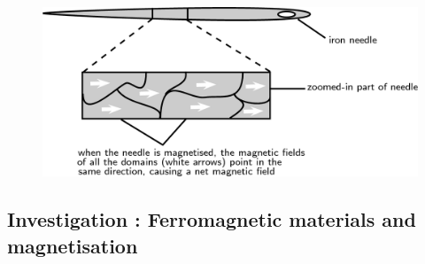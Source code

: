 	\begin{figure}[H] %
    \begin{center}
    \label{m37830*id128403!!!underscore!!!media}\label{m37830*id128403!!!underscore!!!printimage}\includegraphics[width=0.8\columnwidth]{col11305.imgs/m37830_PG10C7_003.png} %
        
      \vspace{2pt}
    \vspace{.1in}
    
    \end{center}

 \end{figure}   

    \addtocounter{footnote}{-0}
    
      \par 
\label{m37830*secfhsst!!!underscore!!!id122}
            \subsection{  Investigation : Ferromagnetic materials and magnetisation }
            \nopagebreak
            
